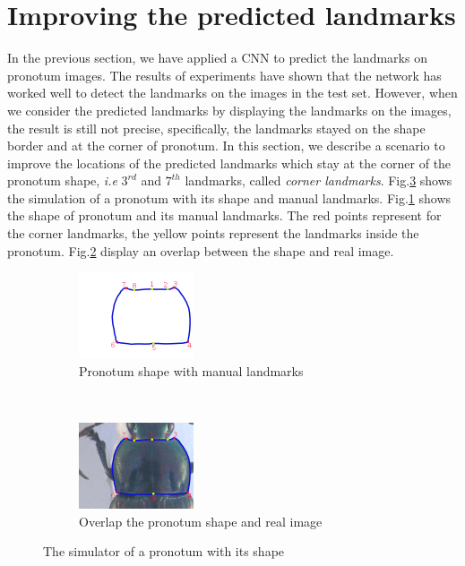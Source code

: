 \documentclass[10pt]{article}
\begin{document}
\section{Improving the predicted landmarks}
\label{secimproving}
In the previous section, we have applied a CNN to predict the landmarks on pronotum images. The results of experiments have shown that the network has worked well to detect the landmarks on the images in the test set. However, when we consider the predicted landmarks by displaying the landmarks on the images, the result is still not precise, specifically, the landmarks stayed on the shape border and at the corner of pronotum. In this section, we describe a scenario to improve the locations of the predicted landmarks which stay at the corner of the pronotum shape, \textit{i.e}  $3^{rd} $ and $7^{th}$ landmarks, called \textit{corner landmarks}. Fig.\ref{figshape} shows the simulation of a pronotum with its shape and manual landmarks. Fig.\ref{figsub11} shows the shape of pronotum and its manual landmarks. The red points represent for the corner landmarks, the yellow points represent the landmarks inside the pronotum. Fig.\ref{figsub22} display an overlap between the shape and real image.

\begin{figure}[htbp]
    \centering
    \begin{subfigure}[t]{0.25\textwidth}
        \centering
        \includegraphics[height=1in]{images/pronotum_model}
        \caption{Pronotum shape with manual landmarks}
        \label{figsub11}
    \end{subfigure}%
    ~ 
    \begin{subfigure}[t]{0.25\textwidth}
        \centering
        \includegraphics[height=1in]{images/pronotum_overlap}
        \caption{Overlap the pronotum shape and real image}
        \label{figsub22}
    \end{subfigure}
    \caption{The simulator of a pronotum with its shape } 
    \label{figshape}
\end{figure}
\end{document}
